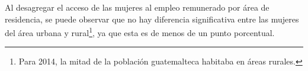 Al desagregar el acceso de las mujeres al empleo remunerado por área de residencia, se puede observar que no hay diferencia significativa entre las mujeres del área urbana y rural\footnote{Para 2014, la mitad de la población guatemalteca habitaba en áreas rurales.}, ya que esta es de menos de un punto porcentual. 

